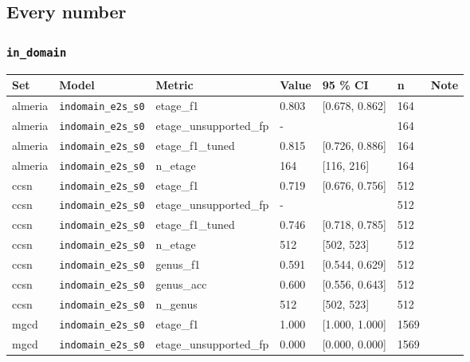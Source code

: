 \subsection{Every number}

\subsubsection{\texttt{in\_\allowbreak{}domain}}

\begin{center}{\scriptsize\setlength{\tabcolsep}{3pt}
\begin{tabular}{lllllll}
\toprule
Set & Model & Metric & Value & 95 \% CI & n & Note \\
\midrule
almeria & \texttt{indomain\_\allowbreak{}e2s\_\allowbreak{}s0} & etage\_f1 & 0.803 & [0.678, 0.862] & 164 &  \\
almeria & \texttt{indomain\_\allowbreak{}e2s\_\allowbreak{}s0} & etage\_unsupported\_fp & - &  & 164 &  \\
almeria & \texttt{indomain\_\allowbreak{}e2s\_\allowbreak{}s0} & etage\_f1\_tuned & 0.815 & [0.726, 0.886] & 164 &  \\
almeria & \texttt{indomain\_\allowbreak{}e2s\_\allowbreak{}s0} & n\_etage & 164 & [116, 216] & 164 &  \\
ccsn & \texttt{indomain\_\allowbreak{}e2s\_\allowbreak{}s0} & etage\_f1 & 0.719 & [0.676, 0.756] & 512 &  \\
ccsn & \texttt{indomain\_\allowbreak{}e2s\_\allowbreak{}s0} & etage\_unsupported\_fp & - &  & 512 &  \\
ccsn & \texttt{indomain\_\allowbreak{}e2s\_\allowbreak{}s0} & etage\_f1\_tuned & 0.746 & [0.718, 0.785] & 512 &  \\
ccsn & \texttt{indomain\_\allowbreak{}e2s\_\allowbreak{}s0} & n\_etage & 512 & [502, 523] & 512 &  \\
ccsn & \texttt{indomain\_\allowbreak{}e2s\_\allowbreak{}s0} & genus\_f1 & 0.591 & [0.544, 0.629] & 512 &  \\
ccsn & \texttt{indomain\_\allowbreak{}e2s\_\allowbreak{}s0} & genus\_acc & 0.600 & [0.556, 0.643] & 512 &  \\
ccsn & \texttt{indomain\_\allowbreak{}e2s\_\allowbreak{}s0} & n\_genus & 512 & [502, 523] & 512 &  \\
mgcd & \texttt{indomain\_\allowbreak{}e2s\_\allowbreak{}s0} & etage\_f1 & 1.000 & [1.000, 1.000] & 1569 &  \\
mgcd & \texttt{indomain\_\allowbreak{}e2s\_\allowbreak{}s0} & etage\_unsupported\_fp & 0.000 & [0.000, 0.000] & 1569 &  \\

\end{tabular}}
\end{center}
